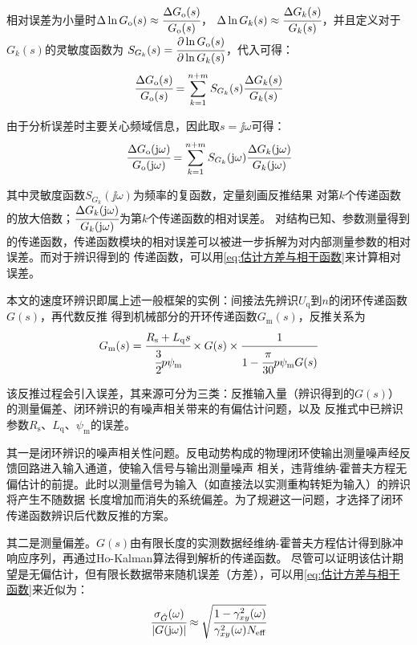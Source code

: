 相对误差为小量时\(\Delta\ln G_{\mathrm{o}}(s)\approx\cfrac{\Delta G_{\mathrm{o}}(s)}{G_{\mathrm{o}}(s)}\)，
\(\Delta\ln G_k(s)\approx\cfrac{\Delta G_k(s)}{G_k(s)}\)，并且定义对于\(G_k(s)\)的灵敏度函数为
\(S_{G_k}(s)=\cfrac{\partial\ln G_{\mathrm{o}}(s)}{\partial\ln G_k(s)}\)，代入可得：
\begin{equation*}
    \cfrac{\Delta G_{\mathrm{o}}(s)}{G_{\mathrm{o}}(s)}
    =\sum_{k=1}^{n+m}S_{G_k}(s)\cfrac{\Delta G_k(s)}{G_k(s)}
\end{equation*}

由于分析误差时主要关心频域信息，因此取\(s=\jj\omega\)可得：
\begin{equation*}
    \cfrac{\Delta G_{\mathrm{o}}(\mathrm{j}\omega)}{G_{\mathrm{o}}(\mathrm{j}\omega)}
    =\sum_{k=1}^{n+m}S_{G_k}(\mathrm{j}\omega)\cfrac{\Delta G_k(\mathrm{j}\omega)}{G_k(\mathrm{j}\omega)}
\end{equation*}


其中灵敏度函数\(S_{G_k}(\jj\omega)\)为频率的复函数，定量刻画反推结果
对第\(k\)个传递函数的放大倍数；\(\cfrac{\Delta G_k(\mathrm{j}\omega)}{G_k(\mathrm{j}\omega)}\)为第\(k\)个传递函数的相对误差。
对结构已知、参数测量得到的传递函数，传递函数模块的相对误差可以被进一步拆解为对内部测量参数的相对误差。而对于辨识得到的
传递函数，可以用\ref{eq:估计方差与相干函数}来计算相对误差。

本文的速度环辨识即属上述一般框架的实例：间接法先辨识\(U_{\mathrm{q}}\)到\(n\)的闭环传递函数\(G(s)\)，再代数反推
得到机械部分的开环传递函数\(G_{\mathrm{m}}(s)\)，反推关系为
\begin{equation*}
    G_{\mathrm{m}}(s)=\cfrac{R_{\mathrm{s}}+L_{\mathrm{q}}s}{\cfrac{3}{2}p\psi_{\mathrm{m}}}\times G(s)\times\cfrac{1}{1-\cfrac{\pi}{30}p\psi_{\mathrm{m}}G(s)}
\end{equation*}

该反推过程会引入误差，其来源可分为三类：反推输入量（辨识得到的\(G(s)\)）的测量偏差、闭环辨识的有噪声相关带来的有偏估计问题，以及
反推式中已辨识参数\(R_{\mathrm{s}}\)、\(L_{\mathrm{q}}\)、\(\psi_{\mathrm{m}}\)的误差。

其一是闭环辨识的噪声相关性问题。反电动势构成的物理闭环使输出测量噪声经反馈回路进入输入通道，使输入信号与输出测量噪声
相关，违背维纳-霍普夫方程无偏估计的前提。此时以测量信号为输入（如直接法以实测重构转矩为输入）的辨识将产生不随数据
长度增加而消失的系统偏差。为了规避这一问题，才选择了闭环传递函数辨识后代数反推的方案。

其二是测量偏差。\(G(s)\)由有限长度的实测数据经维纳-霍普夫方程估计得到脉冲响应序列，再通过Ho-Kalman算法得到解析的传递函数。
尽管可以证明该估计期望是无偏估计，但有限长数据带来随机误差（方差），可以用\ref{eq:估计方差与相干函数}来近似为：
\begin{equation*}
    \cfrac{\sigma_{\hat G}(\omega)}{|G(\mathrm{j}\omega)|}
    \approx\sqrt{\cfrac{1-\gamma_{xy}^2(\omega)}{\gamma_{xy}^2(\omega)N_{\mathrm{eff}}}}
\end{equation*}

